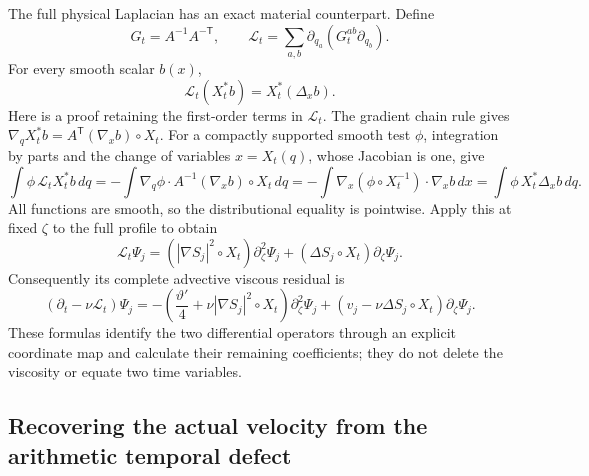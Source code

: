 The full physical Laplacian has an exact material counterpart. Define
\[
 G_t=A^{-1}A^{-\mathsf T},\qquad
 \mathcal L_t=\sum_{a,b}\partial_{q_a}
                         (G_t^{ab}\partial_{q_b}).
\]
For every smooth scalar $b(x)$,
\begin{equation}
 \mathcal L_t(X_t^*b)=X_t^*(\Delta_xb).
 \label{nfl:laplace}
\end{equation}
Here is a proof retaining the first-order terms in $\mathcal L_t$.
The gradient chain rule gives $\nabla_qX_t^*b=A^{\mathsf T}
(\nabla_xb)\circ X_t$. For a compactly supported smooth test $\phi$,
integration by parts and the change of variables $x=X_t(q)$, whose
Jacobian is one, give
\[
 \int\phi\,\mathcal L_tX_t^*b\,dq
 =-\int\nabla_q\phi\cdot A^{-1}(\nabla_xb)\circ X_t\,dq
 =-\int\nabla_x(\phi\circ X_t^{-1})\cdot\nabla_xb\,dx
 =\int\phi\,X_t^*\Delta_xb\,dq.
\]
All functions are smooth, so the distributional equality is pointwise.
Apply this at fixed $\zeta$ to the full profile to obtain
\begin{equation}
 \mathcal L_t\Psi_j=(|\nabla S_j|^2\circ X_t)\partial_\zeta^2\Psi_j
                      +(\Delta S_j\circ X_t)\partial_\zeta\Psi_j.
 \label{nfl:profilelaplace}
\end{equation}
Consequently its complete advective viscous residual is
\[
 (\partial_t-\nu\mathcal L_t)\Psi_j
 =-\left(\frac{\vartheta'}4+\nu|\nabla S_j|^2\circ X_t\right)
                                  \partial_\zeta^2\Psi_j
   +(v_j-\nu\Delta S_j\circ X_t)\partial_\zeta\Psi_j.
\]
These formulas identify the two differential operators through an
explicit coordinate map and calculate their remaining coefficients;
they do not delete the viscosity or equate two time variables.

\subsection{Recovering the actual velocity from the arithmetic temporal defect}

